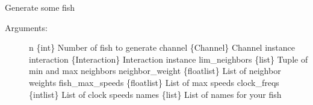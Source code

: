 \documentclass[letterpaper,10pt,english]{sphinxmanual}
\begin{document}
\begin{fulllineitems}
\label{\detokenize{index:utils.generate_fish}}
Generate some fish
\begin{description}
\item[{Arguments:}] \leavevmode
n \{int\} \textendash{} Number of fish to generate
channel \{Channel\} \textendash{} Channel instance
interaction \{Interaction\} \textendash{} Interaction instance
lim\_neighbors \{list\} \textendash{} Tuple of min and max neighbors
neighbor\_weight \{float\textbar{}list\} \textendash{} List of neighbor weights
fish\_max\_speeds \{float\textbar{}list\} \textendash{} List of max speeds
clock\_freqs \{int\textbar{}list\} \textendash{} List of clock speeds
names \{list\} \textendash{} List of names for your fish

\end{description}

\end{fulllineitems}

\end{document}
